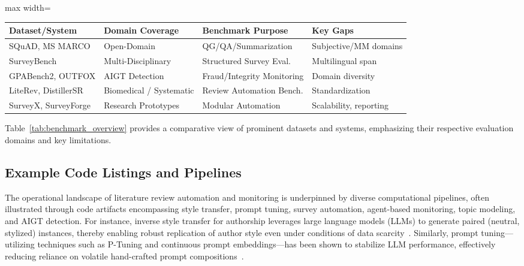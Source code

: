 \documentclass[sigconf]{acmart}
\begin{document}
\begin{table*}[htbp]
\centering
\caption{Overview of representative benchmark datasets and systems, highlighting domain focus, core evaluation roles, and current gaps.}
\label{tab:benchmark_overview}
\begin{adjustbox}{max width=\textwidth}
\begin{tabular}{@{}llll@{}}
\toprule
\textbf{Dataset/System} & \textbf{Domain Coverage} & \textbf{Benchmark Purpose} & \textbf{Key Gaps} \\
\midrule
SQuAD, MS MARCO        & Open-Domain              & QG/QA/Summarization        & Subjective/MM domains \\
SurveyBench            & Multi-Disciplinary       & Structured Survey Eval.    & Multilingual span     \\
GPABench2, OUTFOX      & AIGT Detection           & Fraud/Integrity Monitoring & Domain diversity      \\
LiteRev, DistillerSR   & Biomedical / Systematic  & Review Automation Bench.   & Standardization       \\
SurveyX, SurveyForge   & Research Prototypes      & Modular Automation         & Scalability, reporting\\
\bottomrule
\end{tabular}
\end{adjustbox}
\end{table*}

Table~\ref{tab:benchmark_overview} provides a comparative view of prominent datasets and systems, emphasizing their respective evaluation domains and key limitations.

\subsection{Example Code Listings and Pipelines}

The operational landscape of literature review automation and monitoring is underpinned by diverse computational pipelines, often illustrated through code artifacts encompassing style transfer, prompt tuning, survey automation, agent-based monitoring, topic modeling, and AIGT detection. For instance, inverse style transfer for authorship leverages large language models (LLMs) to generate paired (neutral, stylized) instances, thereby enabling robust replication of author style even under conditions of data scarcity~\cite{ref77}. Similarly, prompt tuning---utilizing techniques such as P-Tuning and continuous prompt embeddings---has been shown to stabilize LLM performance, effectively reducing reliance on volatile hand-crafted prompt compositions~\cite{ref78}\cite{ref103}.
\end{document}
